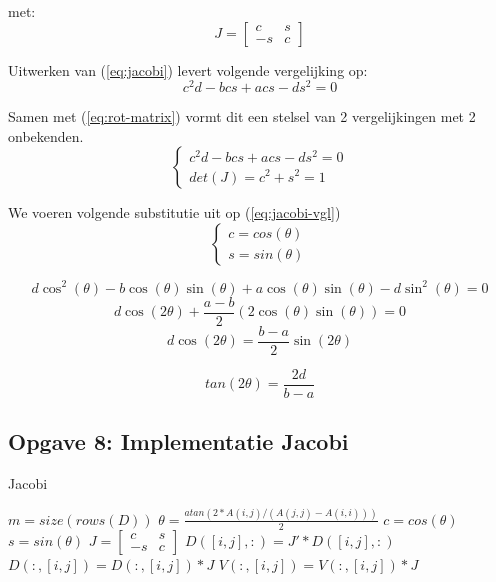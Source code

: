 \documentclass[a4paper]{article}
\newcommand{\opgave}[1]{\subsection{Opgave #1}}
\begin{document}
met: $$J = \begin{bmatrix}
c & s \\ -s & c
\end{bmatrix}$$

Uitwerken van (\ref{eq:jacobi}) levert volgende vergelijking op:
\begin{equation} \label{eq:jacobi-vgl}
c^2d-bcs+acs-ds^2 = 0
\end{equation}

Samen met (\ref{eq:rot-matrix}) vormt dit een stelsel van 2 vergelijkingen met 2 onbekenden.
\begin{equation}
\begin{cases}
c^2d-bcs+acs-ds^2 = 0 \\ det(J) = c^2 + s^2 = 1
\end{cases}
\end{equation}

We voeren volgende substitutie uit op (\ref{eq:jacobi-vgl})
\begin{equation}
\begin{cases}
c = cos(\theta) \\ s = sin(\theta)
\end{cases}
\end{equation}

$$ d \cos^2(\theta) - b \cos(\theta) \sin(\theta) + a \cos(\theta) \sin(\theta) - d \sin^2(\theta) = 0$$
$$ d \cos(2\theta) + \frac{a-b}{2}(2 \cos(\theta)\sin(\theta)) = 0 $$
$$ d \cos(2\theta) = \frac{b-a}{2}\sin(2\theta)$$

\begin{equation}
tan(2\theta) = \frac{2d}{b-a}
\end{equation}

\opgave{8: Implementatie Jacobi}\label{sec:oef8}

\begin{algorithm}[H]
\begin{algorithmic}[H]\label{alg:SI}\caption{Jacobi}
\State $m = size(rows(D))$
\State $\theta = \frac{atan(2*A(i,j)/(A(j,j) - A(i,i)))}{2}$
\State $c = cos(\theta)$
\State $s = sin(\theta)$
\State $J = \begin{bmatrix}c & s \\ -s & c \end{bmatrix}$
\State $D([i, j], :) = J' * D([i, j], :)$
\State $D(:, [i, j]) = D(:, [i, j]) * J$
\State $V(:, [i, j]) = V(:, [i, j]) * J$
\EndFor
\EndFor
\EndWhile
\end{algorithmic}
\end{algorithm}
\end{document}
